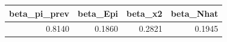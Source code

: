 \begin{tabular}{rrrr}
\toprule
beta_pi_prev & beta_Epi & beta_x2 & beta_Nhat \\
\midrule
0.8140 & 0.1860 & 0.2821 & 0.1945 \\
\bottomrule
\end{tabular}
